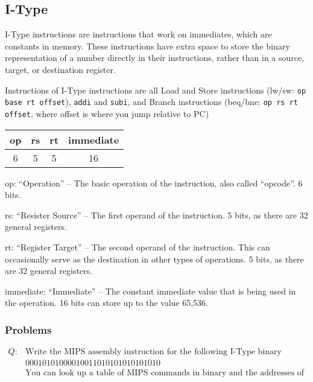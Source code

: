 \documentclass{article}
\begin{document}
\subsection{I-Type}\label{IType}

I-Type instructions are instructions that work on immediates, which are constants in memory. These instructions have extra space to store the binary representation of a number directly in their instructions, rather than in a source, target, or destination register. 

Instructions of I-Type instructions are all Load and Store instructions (lw/sw: \texttt{op base rt offset}), \texttt{addi} and \texttt{subi}, and Branch instructions (beq/bne: \texttt{op rs rt offset}, where offset is where you jump relative to PC)

\begin{tabular}{| c | c | c | c |}
    \hline
        op & rs & rt & immediate \\
        \hline
        6 & 5 & 5 & 16 \\
    \hline
\end{tabular}

op: ``Operation'' -- The basic operation of the instruction, also called ``opcode''. 6 bits.

rs: ``Resister Source'' -- The first operand of the instruction. 5 bits, as there are 32 general registers. 

rt: ``Register Target'' -- The second operand of the instruction. This can occasionally serve as the destination in other types of operations. 5 bits, as there are 32 general registers. 

immediate: ``Immediate'' -- The constant immediate value that is being used in the operation. 16 bits can store up to the value 65,536.

\subsubsection{Problems}\label{ITypeProblems}

\begin{equation}\label{IType1}
\begin{aligned}
    Q: & \text{Write the MIPS assembly instruction for the following I-Type binary instruction:}\\
    & 00010101000010011010101010101010\\
    & \text{You can look up a table of MIPS commands in binary and the addresses of registers.}
\end{aligned}
\end{equation}
\end{document}
